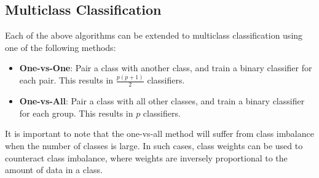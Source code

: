 \documentclass{article}
\begin{document}
\subsection{Multiclass Classification}
Each of the above algorithms can be extended to multiclass
classification using one of the following methods:
\begin{itemize}
    \item \textbf{One-vs-One}: Pair a class with another class, and
          train a binary classifier for each pair. This results in
          \(\frac{p \left( p + 1 \right)}{2}\) classifiers.
    \item \textbf{One-vs-All}: Pair a class with all other classes, and
          train a binary classifier for each group. This results in \(p\)
          classifiers.
\end{itemize}
It is important to note that the one-vs-all method will suffer from class
imbalance when the number of classes is large. In such cases, class
weights can be used to counteract class imbalance, where weights are
inversely proportional to the amount of data in a class.
\end{document}
